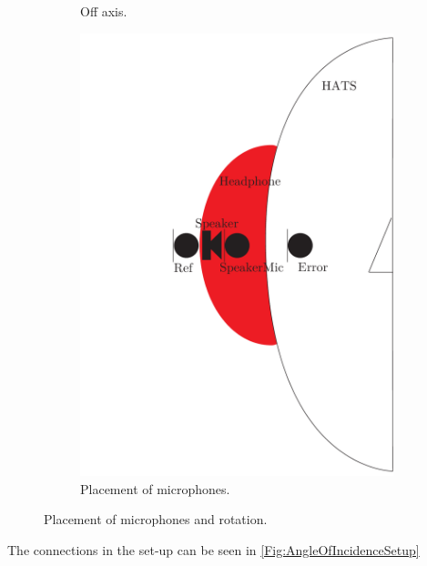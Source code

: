 \begin{figure}[H]
\begin{subfigure}[b]{.4\textwidth}
		\caption{Off axis.}
		\label{fig:AngOfIndOffax}
	\end{subfigure} 
	\begin{subfigure}[b]{.4\textwidth}
	\centering
	\includegraphics[width=\textwidth]{../Journal/Experiments/AngleOfIncidence/AngleOfIncidenceSchematic.pdf}
	\caption{Placement of microphones.}
	\label{fig:AngOgIndMicplace}
\end{subfigure}
	\caption{Placement of microphones and rotation.}
	\label{fig:AngleOfIndDiagram}
\end{figure}
The connections in the set-up can be seen in \autoref{Fig:AngleOfIncidenceSetup}
